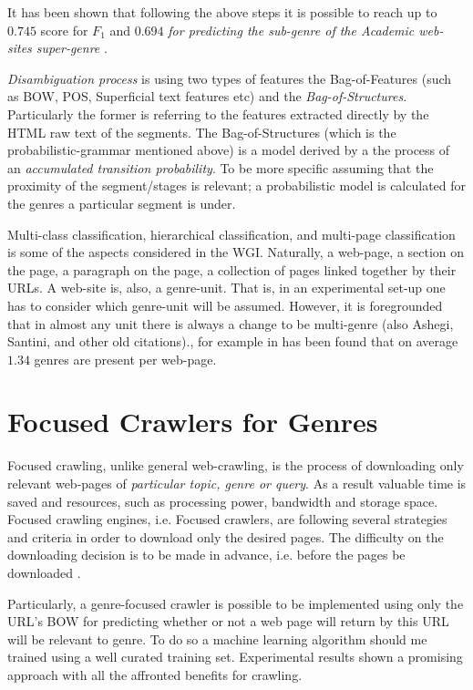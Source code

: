It has been shown that following the above steps it is possible to reach up to $0.745$ score for $F_{1}$ and $0.694$  \textit{for predicting the sub-genre of the Academic web-sites super-genre }.

\textit{Disambiguation process} is using two types of features the Bag-of-Features (such as BOW, POS, Superficial text features etc) and the \textit{Bag-of-Structures}. Particularly the former is referring to the features extracted directly by the HTML raw text of the segments. The Bag-of-Structures (which is the probabilistic-grammar mentioned above) is a model derived by a the process of an \textit{accumulated transition probability}. To be more specific assuming that the proximity of the segment/stages is relevant; a probabilistic model is calculated for the genres a particular segment is under.

Multi-class classification, hierarchical classification, and multi-page classification is some of the aspects considered in the WGI. Naturally, a web-page, a section on the page, a paragraph on the page, a collection of pages linked together by their URLs. A web-site is, also, a genre-unit. That is, in an experimental set-up one has to consider which genre-unit will be assumed. However, it is foregrounded that in almost any unit there is always a change to be multi-genre \parencite{lee2017text} (also Ashegi, Santini, and other old citations)., for example in \parencite{madjarov2015web} has been found that on average $1.34$ genres are present per web-page.

\section{Focused Crawlers for Genres}\label{chap:relevant_work:sec:focused_crawlers}

Focused crawling, unlike general web-crawling, is the process of downloading only relevant web-pages of \textit{particular topic, genre or query}. As a result valuable time is saved and resources, such as processing power, bandwidth and storage space. Focused crawling engines, i.e. Focused crawlers, are following several strategies and criteria in order to download only the desired pages. The difficulty on the downloading decision is to be made in advance, i.e. before the pages be downloaded \parencite{priyatam2013don_URL} . 
 
Particularly, a genre-focused crawler is possible to be implemented using only the URL's BOW for predicting whether or not a web page will return by this URL will be relevant to genre. To do so a machine learning algorithm should me trained using a well curated training set. Experimental results shown a promising approach with all the affronted benefits for crawling.


